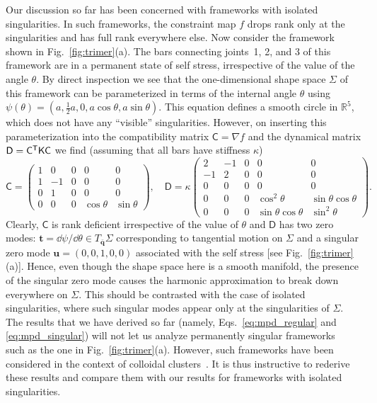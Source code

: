 Our discussion so far has been concerned with frameworks with isolated singularities.
In such frameworks, the constraint map $f$ drops rank only at the singularities and has full rank everywhere else.
Now consider the framework shown in Fig.~\ref{fig:trimer}(a).
The bars connecting joints~1, 2, and 3 of this framework are in a permanent state of self stress, irrespective of the value of the angle $\theta$.
By direct inspection we see that the one-dimensional shape space $\Sigma$ of this framework can be parameterized in terms of the internal angle $\theta$ using $\psi(\theta) = (a, \frac{1}{2}a, 0, a\cos{\theta}, a\sin{\theta})$.
This equation defines a smooth circle in $\mathbb{R}^{5}$, which does not have any ``visible'' singularities.
However, on inserting this parameterization into the compatibility matrix $\mathsf{C} = \nabla f$ and the dynamical matrix $\mathsf{D} = \mathsf{C}^\mathsf{T}\mathsf{K}\mathsf{C}$ we find (assuming that all bars have stiffness $\kappa$)
%
\begin{equation}
  \mathsf{C} =
  \begin{pmatrix}
    1 & 0 & 0 & 0 & 0 \\
    1 & -1 & 0 & 0 & 0 \\
    0 & 1 & 0 & 0 & 0 \\
    0 & 0 & 0 & \cos \theta & \sin \theta
  \end{pmatrix},
  \quad
  \mathsf{D} =
  \kappa
  \begin{pmatrix}
    2 & -1 & 0 & 0 & 0 \\
    -1 & 2 & 0 & 0 & 0 \\
    0 & 0 & 0 & 0 & 0 \\
    0 & 0 & 0 & \cos ^2\theta & \sin \theta  \cos \theta \\
    0 & 0 & 0 & \sin \theta \cos \theta & \sin ^2\theta
  \end{pmatrix}.
\end{equation}
%
Clearly, $\mathsf{C}$ is rank deficient irrespective of the value of $\theta$ and $\mathsf{D}$ has two zero modes: $\bm{t} = \dd\psi/\dd\theta \in T_{\bar{\bm{q}}}\Sigma$ corresponding to tangential motion on $\Sigma$ and a singular zero mode $\bm{u} = (0, 0, 1, 0, 0)$ associated with the self stress [see Fig.~\ref{fig:trimer}(a)].
Hence, even though the shape space here is a smooth manifold, the presence of the singular zero mode causes the harmonic approximation to break down everywhere on $\Sigma$.
This should be contrasted with the case of isolated singularities, where such singular modes appear only at the singularities of $\Sigma$.
The results that we have derived so far (namely, Eqs.~\ref{eq:mpd_regular} and \ref{eq:mpd_singular}) will not let us analyze permanently singular frameworks~\cite{muller2019,wu2020} such as the one in Fig.~\ref{fig:trimer}(a).
However, such frameworks have been considered in the context of colloidal clusters~\cite{kallus2017}.
It is thus instructive to rederive these results and compare them with our results for frameworks with isolated singularities.

